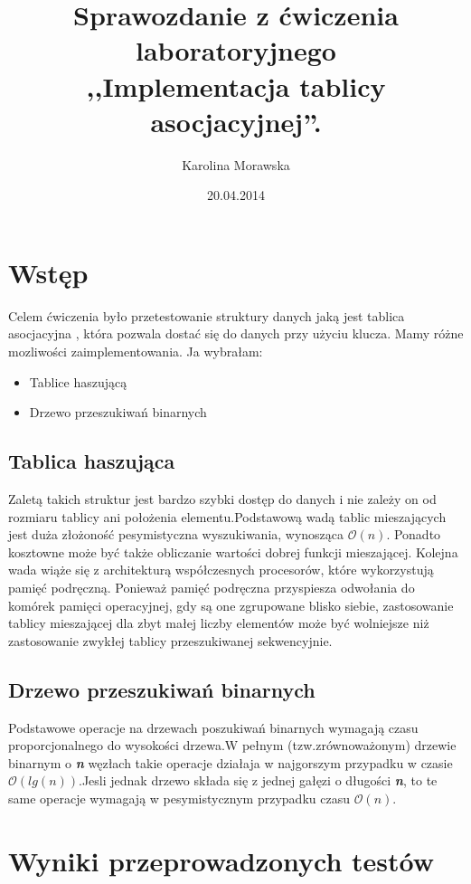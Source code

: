 \documentclass[11pt]{article}
\title{Sprawozdanie z ćwiczenia laboratoryjnego \\,,Implementacja tablicy asocjacyjnej''. }
\author{Karolina Morawska}
\date{20.04.2014}
\begin{document}
\maketitle
\newpage
\section{Wstęp}

Celem ćwiczenia było przetestowanie struktury danych jaką jest tablica asocjacyjna , która pozwala dostać się do danych przy użyciu klucza. Mamy różne mozliwości zaimplementowania. Ja wybrałam:

  \begin{itemize}
  \item Tablice haszującą
  \item Drzewo przeszukiwań binarnych
  \end{itemize}

\subsection{Tablica haszująca}

Zaletą takich struktur jest bardzo szybki dostęp do danych i nie zależy on od rozmiaru tablicy ani położenia elementu.Podstawową wadą tablic mieszających jest duża złożoność pesymistyczna wyszukiwania, wynosząca $\mathcal{O}(n)$. Ponadto kosztowne może być także obliczanie wartości dobrej funkcji mieszającej.
Kolejna wada wiąże się z architekturą współczesnych procesorów, które wykorzystują pamięć podręczną. Ponieważ pamięć podręczna przyspiesza odwołania do komórek pamięci operacyjnej, gdy są one zgrupowane blisko siebie, zastosowanie tablicy mieszającej dla zbyt małej liczby elementów może być wolniejsze niż zastosowanie zwykłej tablicy przeszukiwanej sekwencyjnie.
\subsection{Drzewo przeszukiwań binarnych }

Podstawowe operacje na drzewach poszukiwań binarnych wymagają czasu proporcjonalnego do wysokości drzewa.W pełnym (tzw.zrównoważonym) drzewie binarnym o \textbf{\textsl{n}} węzłach takie operacje działaja w najgorszym przypadku w czasie $\mathcal{O}(lg(n))$.Jesli jednak drzewo składa się z jednej gałęzi o długości \textbf{\textsl{n}}, to te same operacje wymagają w pesymistycznym przypadku czasu $\mathcal{O}(n)$.

\newpage
\section{Wyniki przeprowadzonych testów}
\end{document}
